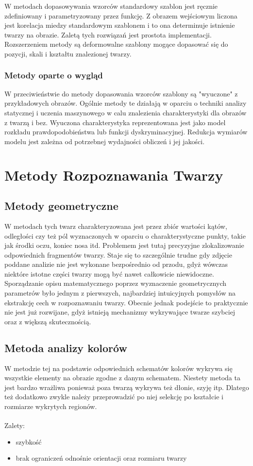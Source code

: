 \documentclass[11pt,a4paper]{article}
\begin{document}
W metodach dopasowywania wzorców standardowy szablon jest ręcznie zdefiniowany i parametryzowany przez funkcję. Z obrazem wejściowym liczona jest korelacja miedzy standardowym szablonem i to ona determinuje istnienie twarzy na obrazie. Zaletą tych rozwiązań jest prostota implementacji. Rozszerzeniem metody są deformowalne szablony mogące dopasować się do pozycji, skali i kształtu znalezionej twarzy.

\subsubsection{Metody oparte o wygląd}

W przeciwieństwie do metody dopasowania wzorców szablony są "wyuczone" z przykładowych obrazów. Ogólnie metody te działają w oparciu o techniki analizy statycznej i uczenia maszynowego w calu znalezienia charakterystyki dla obrazów z twarzą i bez. Wyuczona charakterystyka reprezentowana jest jako model rozkładu prawdopodobieństwa lub funkcji dyskryminacyjnej. Redukcja wymiarów modelu jest zależna od potrzebnej wydajności obliczeń i jej jakości.

\section{Metody Rozpoznawania Twarzy}

\subsection{Metody geometryczne}
W metodach tych twarz charakteryzowana jest przez zbiór wartości kątów, odległości czy też pól wyznaczonych w oparciu o charakterystyczne punkty, takie jak środki oczu, koniec nosa itd. Problemem jest tutaj precyzyjne zlokalizowanie odpowiednich fragmentów twarzy. Staje się to szczególnie trudne gdy zdjęcie poddane analizie nie jest wykonane bezpośrednio od przodu, gdyż wówczas niektóre istotne części twarzy mogą być nawet całkowicie niewidoczne. Sporządzanie opisu matematycznego poprzez wyznaczenie geometrycznych parametrów było jednym z pierwszych, najbardziej intuicyjnych pomysłów na ekstrakcję cech w rozpoznawaniu twarzy. Obecnie jednak podejście to praktycznie nie jest już rozwijane, gdyż istnieją mechanizmy wykrywające twarze szybciej oraz z większą skutecznością.

\subsection{Metoda analizy kolorów}
W metodzie tej na podstawie odpowiednich schematów kolorów wykrywa się wszystkie elementy na obrazie zgodne z danym schematem. Niestety metoda ta jest bardzo wrażliwa ponieważ poza twarzą wykrywa też dłonie, szyję itp. Dlatego też dodatkowo zwykle należy przeprowadzić po niej selekcję po kształcie i rozmiarze wykrytych regionów. 
\\
\\
\noindent Zalety:
\begin{itemize}
\item szybkość
\item brak ograniczeń odnośnie orientacji oraz rozmiaru twarzy
\end{itemize}
\end{document}
